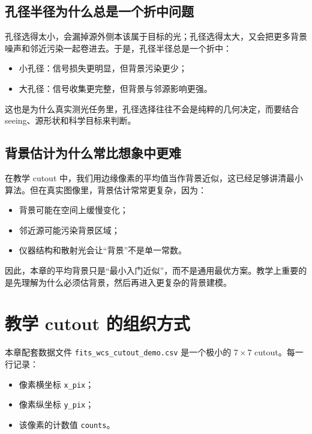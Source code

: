 \subsection{孔径半径为什么总是一个折中问题}

孔径选得太小，会漏掉源外侧本该属于目标的光；孔径选得太大，又会把更多背景噪声和邻近污染一起卷进去。于是，孔径半径总是一个折中：

\begin{itemize}
    \item 小孔径：信号损失更明显，但背景污染更少；
    \item 大孔径：信号收集更完整，但背景与邻源影响更强。
\end{itemize}

这也是为什么真实测光任务里，孔径选择往往不会是纯粹的几何决定，而要结合 seeing、源形状和科学目标来判断。

\subsection{背景估计为什么常比想象中更难}

在教学 cutout 中，我们用边缘像素的平均值当作背景近似，这已经足够讲清最小算法。但在真实图像里，背景估计常常更复杂，因为：

\begin{itemize}
    \item 背景可能在空间上缓慢变化；
    \item 邻近源可能污染背景区域；
    \item 仪器结构和散射光会让“背景”不是单一常数。
\end{itemize}

因此，本章的平均背景只是“最小入门近似”，而不是通用最优方案。教学上重要的是先理解为什么必须估背景，然后再进入更复杂的背景建模。

\section{教学 cutout 的组织方式}

本章配套数据文件 \nolinkurl{fits_wcs_cutout_demo.csv} 是一个极小的 $7\times7$ cutout。每一行记录：

\begin{itemize}
    \item 像素横坐标 \texttt{x\_pix}；
    \item 像素纵坐标 \texttt{y\_pix}；
    \item 该像素的计数值 \texttt{counts}。
\end{itemize}

